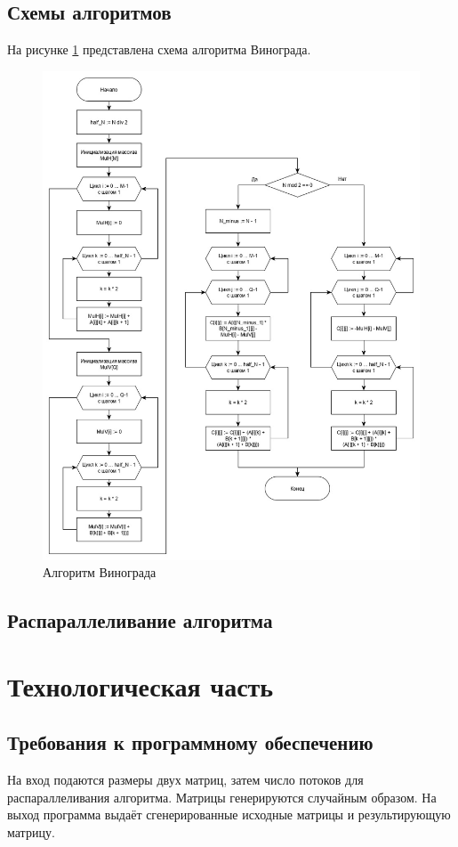 \documentclass[12pt, a4paper]{report}
\begin{document}
	\section{Схемы алгоритмов}
	На рисунке \ref{pic:vin} представлена схема алгоритма Винограда.
	\newpage
	\begin{figure}[ht!]
		\centering
		\includegraphics[scale=0.55]{vin.jpg}
		\caption{Алгоритм Винограда}
		\label{pic:vin}
	\end{figure}

	\newpage
	
	\section{Распараллеливание алгоритма}
	
	\chapter{Технологическая часть}
	\section{Требования к программному обеспечению}
	На вход подаются размеры двух матриц, затем число потоков для распараллеливания алгоритма. Матрицы генерируются случайным образом. На выход программа выдаёт сгенерированные исходные матрицы и результирующую матрицу.
\end{document}
